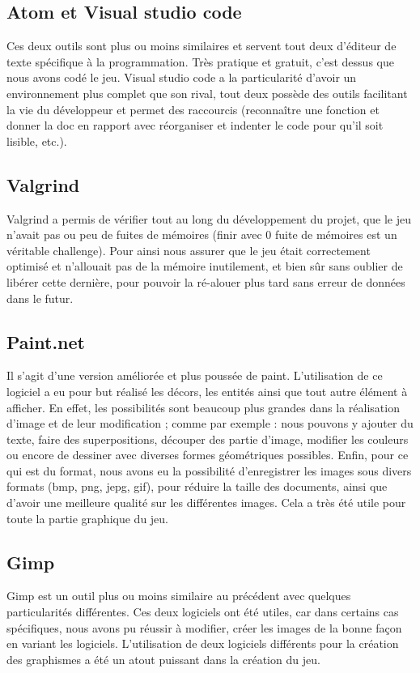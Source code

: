 \documentclass[a4paper,11pt]{article}
\begin{document}
\subsection{Atom et Visual studio code}
Ces deux outils sont plus ou moins similaires et servent tout deux d'éditeur de texte spécifique à la programmation. Très pratique et gratuit, c'est dessus que nous avons codé le jeu. Visual studio code a la particularité d'avoir un environnement plus complet que son rival, tout deux possède des outils facilitant la vie du développeur et permet des raccourcis (reconnaître une fonction et donner la doc en rapport avec réorganiser et indenter le code pour qu'il soit lisible, etc.).\\
\subsection{Valgrind}
Valgrind a permis de vérifier tout au long du développement du projet, que le jeu n'avait pas ou peu de fuites de mémoires (finir avec 0 fuite de mémoires est un véritable challenge). Pour ainsi nous assurer que le jeu était correctement optimisé et n'allouait pas de la mémoire inutilement, et bien sûr sans oublier de libérer cette dernière, pour pouvoir la ré-alouer plus tard sans erreur de données dans le futur.\\
\subsection{Paint.net}
Il s'agit d'une version améliorée et plus poussée de paint. L'utilisation de ce logiciel a eu pour but réalisé les décors, les entités ainsi que tout autre élément à afficher. En effet, les possibilités sont beaucoup plus grandes dans la réalisation d'image et de leur modification ; comme par exemple : nous pouvons y ajouter du texte, faire des superpositions, découper des partie d'image, modifier les couleurs ou encore de dessiner avec diverses formes géométriques possibles. Enfin, pour ce qui est du format, nous avons eu la possibilité d'enregistrer les images sous divers formats (bmp, png, jepg, gif), pour réduire la taille des documents, ainsi que d'avoir une meilleure qualité sur les différentes images. Cela a très été utile pour toute la partie graphique du jeu.\\
\subsection{Gimp}
Gimp est un outil plus ou moins similaire au précédent avec quelques particularités différentes. Ces deux logiciels ont été utiles, car dans certains cas spécifiques, nous avons pu réussir à modifier, créer les images de la bonne façon en variant les logiciels. L'utilisation de deux logiciels différents pour la création des graphismes a été un atout puissant dans la création du jeu.\\
\end{document}
